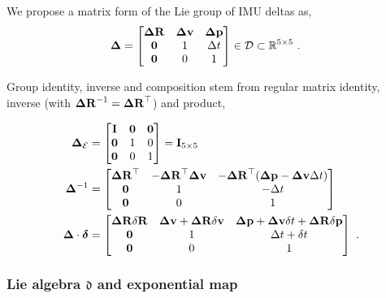 We propose a matrix form of the Lie group of IMU deltas as,
%
\begin{align}\label{equ:delta_Lie}
{{\bm \Delta}} &= 
\begin{bmatrix}
{\bm \Delta {\bf R}} & {\bm \Delta {\bf v}} & {\bm \Delta {\bf p}} \\
\bf0 & 1 & \Delta t \\
\bf0 & 0 & 1
\end{bmatrix} \in \mathcal{D} \subset {\mathbb R}^{5\times 5}
~.
\end{align}

Group identity, inverse and composition stem from regular matrix identity, inverse (with ${\bm \Delta {\bf R}}^{-1}={\bm \Delta {\bf R}}^{\top}$) and product,

\begin{align}
{{\bm \Delta}}_{\mathcal{E}}&=\begin{bmatrix}
{\bf I} & \bf0 & \bf0 \\
\bf0 & 1 & 0 \\
\bf0 & 0 & 1 
\end{bmatrix} = {\bf I}_{5\times5}
\label{equ:identity}
\\
{{\bm \Delta}}^{-1} &= \begin{bmatrix}
{\bm \Delta {\bf R}}^{\top} & -{\bm \Delta {\bf R}}^{\top}{\bm \Delta {\bf v}} & -{\bm \Delta {\bf R}}^{\top}({\bm \Delta {\bf p}}-{\bm \Delta {\bf v}}\Delta t) \\
\bf0 & 1 & -\Delta t \\
\bf0 & 0 & 1
\end{bmatrix} 
\label{equ:inverse}
\\
{{\bm \Delta}}\cdot\bm\delta 
&= 
\begin{bmatrix}
{\bm \Delta {\bf R}}{\delta{\bf R}} & {\bm \Delta {\bf v}} + {\bm \Delta {\bf R}}{\delta{\bf v}} & {\bm \Delta {\bf p}}+{\bm \Delta {\bf v}}\delta t + {\bm \Delta {\bf R}}{\delta{\bf p}} \\
\bf0 & 1 & \Delta t+\delta t \\
\bf0 & 0 & 1
\end{bmatrix}
~.
\label{equ:composition}
\end{align}
%



\subsubsection{Lie algebra \texorpdfstring{$\mathfrak{d}$}{d} and exponential map}

